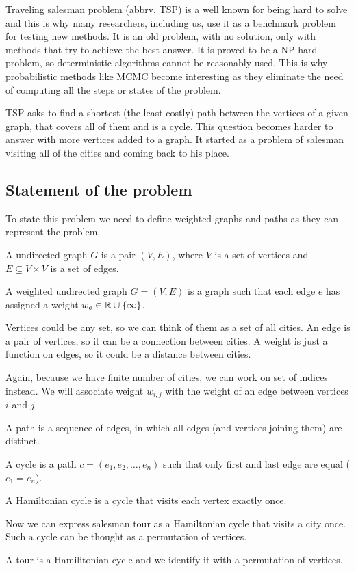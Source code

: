 Traveling salesman problem (abbrv. TSP) is a well known for being hard to solve and this is why many researchers, including us, use it as a benchmark problem for testing new methods. It is an old problem, with no solution, only with methods that try to achieve the best answer. It is proved to be a NP-hard problem, so deterministic algorithms cannot be reasonably used. This is why probabilistic methods like MCMC become interesting as they eliminate the need of computing all the steps or states of the problem.

TSP asks to find a shortest (the least costly) path between the vertices of a given graph, that covers all of them and is a cycle. This question becomes harder to answer with more vertices added to a graph. It started as a problem of salesman visiting all of the cities and coming back to his place.

\subsection{Statement of the problem}
	To state this problem we need to define weighted graphs and paths as they can represent the problem. 
	
	\begin{definition}
		A undirected graph $G$ is a pair $(V, E)$, where $V$ is a set of vertices and $E \subseteq V \times V$ is a set of edges.
	\end{definition}

	\begin{definition}
		A weighted undirected graph $G = (V, E)$ is a graph such that each edge $e$ has assigned a weight $w_e \in \mathbb{R} \cup \left\{ \infty \right\}$.
	\end{definition}
	Vertices could be any set, so we can think of them as a set of all cities. An edge is a pair of vertices, so it can be a connection between cities. A weight is just a function on edges, so it could be a distance between cities. 
	
	Again, because we have finite number of cities, we can work on set of indices instead. We will associate weight $w_{i,j}$ with the weight of an edge between vertices $i$ and $j$.
	
	\begin{definition}
		A path is a sequence of edges, in which all edges (and vertices joining them) are distinct.
	\end{definition}
	\begin{definition}
		A cycle is a path $c = (e_1, e_2, \ldots, e_n)$ such that only first and last edge are equal ($e_1 = e_n$).
	\end{definition}
	\begin{definition}
		A Hamiltonian cycle is a cycle that visits each vertex exactly once.
	\end{definition}
	Now we can express salesman tour as a Hamiltonian cycle that visits a city once. Such a cycle can be thought as a permutation of vertices.
	\begin{definition}
		A tour is a Hamilitonian cycle and we identify it with a permutation of vertices.
	\end{definition}
	
